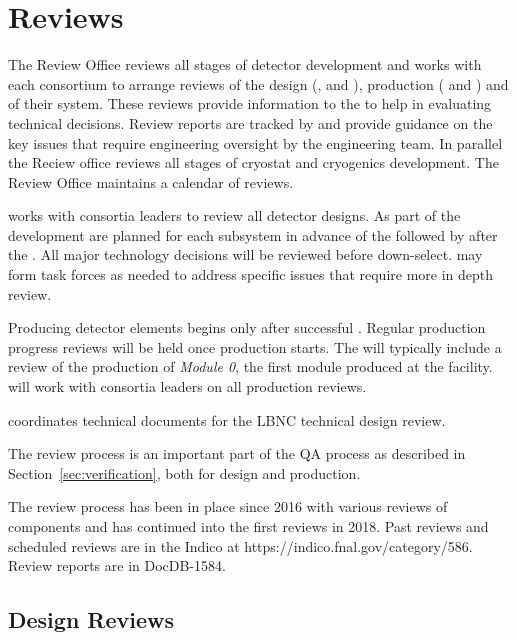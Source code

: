 \chapter{Reviews}
\label{vl:tc-review}

The   Review Office reviews all stages of
detector development and works with each consortium to arrange reviews
of the design (,  and ), production
( and ) and  of their system. These
reviews provide information to the  to help in evaluating
technical decisions.  Review reports are tracked by  and
provide guidance on the key issues that require engineering oversight
by the  engineering team. In parallel the Reciew office
reviews all stages of  cryostat and cryogenics
development. The Review Office maintains a calendar of 
reviews.

 works with consortia leaders to review all detector
designs.  As part of the  development  are
planned for each subsystem in advance of the  followed by
 after the .  All major technology decisions
will be reviewed before down-select.   may form task forces
as needed to address specific issues that require more in depth
review.


Producing detector elements begins only after
successful . Regular production progress
reviews will be held once production starts. The 
will typically include a review of the production of \textit{Module 0}, the
first module produced at the facility.  will work with
consortia leaders on all production reviews.

 coordinates technical documents for the LBNC
technical design review.

The review process is an important part of the  QA process
as described in Section~\ref{sec:verification}, both for
design and production.

The review process has been in place since 2016 with various reviews
of  components and has continued into the first 
reviews in 2018. Past reviews and scheduled reviews are in the
 Indico at https://indico.fnal.gov/category/586.
Review reports are in DocDB-1584\cite{bib:docdb1584}.

\section{Design Reviews}

